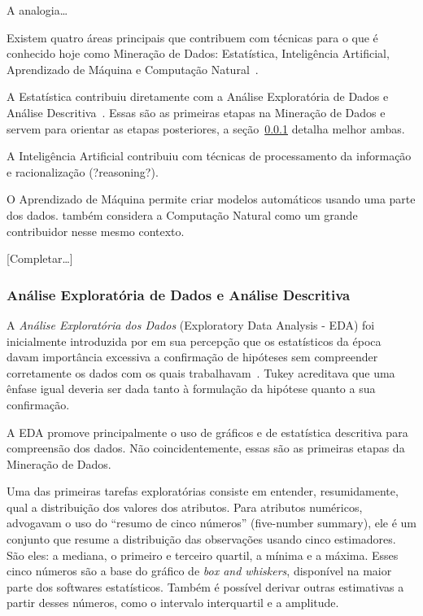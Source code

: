 \documentclass[12pt,a4paper]{article}
\begin{document}
A analogia\ldots

Existem quatro áreas principais que contribuem com técnicas para o que é conhecido hoje como Mineração de Dados: Estatística, Inteligência Artificial, Aprendizado de Máquina e Computação Natural~\cite{Gorunescu2011-oa}.

A Estatística contribuiu diretamente com a Análise Exploratória de Dados e Análise Descritiva~\cite{Gorunescu2011-oa}. Essas são as primeiras etapas na Mineração de Dados e servem para orientar as etapas posteriores, a seção~\ref{sec:analise-exploratoria} detalha melhor ambas.

A Inteligência Artificial contribuiu com técnicas de processamento da informação e racionalização (?reasoning?).

O Aprendizado de Máquina permite criar modelos automáticos usando uma parte dos dados.  também considera a Computação Natural como um grande contribuidor nesse mesmo contexto.

[Completar\ldots]

\subsubsection{Análise Exploratória de Dados e Análise Descritiva}\label{sec:analise-exploratoria}

A \textit{Análise Exploratória dos Dados} (Exploratory Data Analysis - EDA) foi inicialmente introduzida por  em sua percepção que os estatísticos da época davam importância excessiva a confirmação de hipóteses sem compreender corretamente os dados com os quais trabalhavam~\cite{Fernholz2000-rj}. Tukey acreditava que uma ênfase igual deveria ser dada tanto à formulação da hipótese quanto a sua confirmação.

A EDA promove principalmente o uso de gráficos e de estatística descritiva para compreensão dos dados. Não coincidentemente, essas são as primeiras etapas da Mineração de Dados.

Uma das primeiras tarefas exploratórias consiste em entender, resumidamente, qual a distribuição dos valores dos atributos. Para atributos numéricos,  advogavam o uso do \enquote{resumo de cinco números} (five-number summary), ele é um conjunto que resume a distribuição das observações usando cinco estimadores. São eles: a mediana, o primeiro e terceiro quartil, a mínima e a máxima. Esses cinco números são a base do gráfico de \textit{box and whiskers}, disponível na maior parte dos softwares estatísticos. Também é possível derivar outras estimativas a partir desses números, como o intervalo interquartil e a amplitude.
\end{document}
